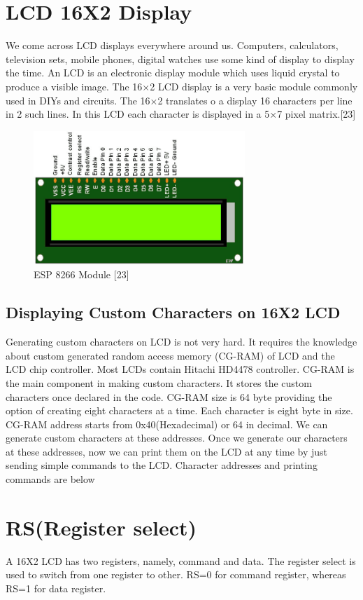\documentclass[twoside,a4paper,16pt]{book}
\begin{document}
{{\begin{itemize}
			\end{itemize}
			\section{LCD 16X2 Display }
			
			
			We come across LCD displays everywhere around us. Computers, calculators, television sets, mobile phones, digital watches use some kind of display to display the time. An LCD is an electronic display module which uses liquid crystal to produce a visible image. The 16×2 LCD display is a very basic module commonly used in DIYs and circuits. The 16×2 translates o a display 16 characters per line in 2 such lines. In this LCD each character is displayed in a 5×7 pixel matrix.[23]
			\begin{figure}[ht!]
				\begin{center}
					\includegraphics[width=8.0cm]{17.png}
					\caption{ESP 8266 Module [23]}
				\end{center}
			\end{figure}
			\subsection{Displaying Custom Characters on 16X2 LCD}
			Generating custom characters on LCD is not very hard. It requires the knowledge about custom generated random access memory (CG-RAM) of LCD and the LCD chip controller. Most LCDs contain Hitachi HD4478 controller. CG-RAM is the main component in making custom characters. It stores the custom characters once declared in the code. CG-RAM size is 64 byte providing the option of creating eight characters at a time. Each character is eight byte in size.
			CG-RAM address starts from 0x40(Hexadecimal) or 64 in decimal. We can generate custom characters at these addresses. Once we generate our characters at these addresses, now we can print them on the LCD at any time by just sending simple commands to the LCD. Character addresses and printing commands are below
			\section*{RS(Register select)}
			A 16X2 LCD has two registers, namely, command and data. The register select is used to switch from one register to other. RS=0 for command register, whereas RS=1 for data register.
			
}}
\end{document}
